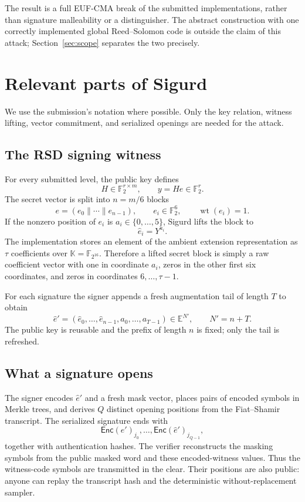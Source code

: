 \documentclass[11pt,a4paper]{article}
\newcommand{\F}{\mathbb{F}}
\newcommand{\K}{\mathbb{K}}
\newcommand{\E}{\mathbb{E}}
\newcommand{\Enc}{\mathsf{Enc}}
\begin{document}
The result is a full EUF-CMA break of the submitted implementations, rather
than signature malleability or a distinguisher.  The abstract construction
with one correctly implemented global Reed--Solomon code is outside the claim
of this attack; Section~\ref{sec:scope} separates the two precisely.

\section{Relevant parts of Sigurd}
\label{sec:sigurd}

We use the submission's notation where possible.  Only the key relation,
witness lifting, vector commitment, and serialized openings are needed for the
attack.

\subsection{The RSD signing witness}

For every submitted level, the public key defines
\[
             H\in\F_2^{r\times m},\qquad y=He\in\F_2^r.
\]
The secret vector is split into $n=m/6$ blocks
\[
            e=(e_0\|\cdots\|e_{n-1}),
            \qquad e_i\in\F_2^6,
            \qquad \operatorname{wt}(e_i)=1.
\]
If the nonzero position of $e_i$ is $a_i\in\{0,\ldots,5\}$, Sigurd lifts the
block to
\[
                       \widehat e_i=Y^{a_i}.
\]
The implementation stores an element of the ambient extension representation
as $\tau$ coefficients over $\K=\F_{2^{16}}$.  Therefore a lifted secret block
is simply a raw coefficient vector with one in coordinate $a_i$, zeros in the
other first six coordinates, and zeros in coordinates $6,\ldots,\tau-1$.

For each signature the signer appends a fresh augmentation tail of length
$T$ to obtain
\[
 \widehat e'=(\widehat e_0,\ldots,\widehat e_{n-1},
                       a_0,\ldots,a_{T-1})\in\E^{N'},
 \qquad N'=n+T.
\]
The public key is reusable and the prefix of length $n$ is fixed; only the tail
is refreshed.

\subsection{What a signature opens}

The signer encodes $\widehat e'$ and a fresh mask vector, places pairs of
encoded symbols in Merkle trees, and derives $Q$ distinct opening positions
from the Fiat--Shamir transcript.  The serialized signature ends with
\[
        \Enc(\widehat e')_{j_0},\ldots,
        \Enc(\widehat e')_{j_{Q-1}},
\]
together with authentication hashes.  The verifier reconstructs the masking
symbols from the public masked word and these encoded-witness values.  Thus the
witness-code symbols are transmitted in the clear.  Their positions are also
public: anyone can replay the transcript hash and the deterministic
without-replacement sampler.
\end{document}
